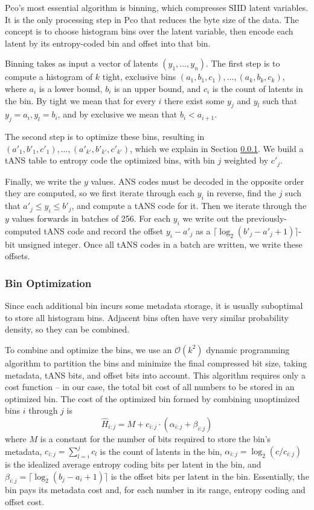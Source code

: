 \documentclass[letterpaper]{article}
\begin{document}
Pco's most essential algorithm is binning, which compresses SIID latent variables.
It is the only processing step in Pco that reduces the byte size of the data.
The concept is to choose histogram bins over the latent variable, then encode each latent by its entropy-coded bin and offset into that bin.

Binning takes as input a vector of latents $(y_1, \ldots, y_n)$.
The first step is to compute a histogram of $k$ tight, exclusive bins $(a_1, b_1, c_1), \ldots, (a_k, b_k, c_k)$, where $a_i$ is a lower bound, $b_i$ is an upper bound, and $c_i$ is the count of latents in the bin.
By tight we mean that for every $i$ there exist some $y_j$ and $y_l$ such that $y_j = a_i, y_l = b_i$, and by exclusive we mean that $b_i < a_{i+1}$.

The second step is to optimize these bins, resulting in $(a'_1, b'_1, c'_1), \ldots, (a'_{k'}, b'_{k'}, c'_{k'})$, which we explain in Section \ref{sec:bin_optimization}.
We build a tANS table \cite{ans} to entropy code the optimized bins, with bin $j$ weighted by $c'_j$.

Finally, we write the $y$ values.
ANS codes must be decoded in the opposite order they are computed, so we first iterate through each $y_i$ in reverse, find the $j$ such that $a'_j \le y_i \le b'_j$, and compute a tANS code for it.
Then we iterate through the $y$ values forwards in batches of 256.
For each $y_i$ we write out the previously-computed tANS code and record the offset $y_i - a'_j$ as a $\lceil\log_2(b'_j - a'_j + 1)\rceil$-bit unsigned integer.
Once all tANS codes in a batch are written, we write these offsets.

\subsubsection{Bin Optimization}
\label{sec:bin_optimization}

Since each additional bin incurs some metadata storage, it is usually suboptimal to store all histogram bins.
Adjacent bins often have very similar probability density, so they can be combined.

To combine and optimize the bins, we use an $\mathcal{O}(k^2)$ dynamic programming algorithm \cite{optimal_partitioning} to partition the bins and minimize the final compressed bit size, taking metadata, tANS bits, and offset bits into account.
This algorithm requires only a cost function -- in our case, the total bit cost of all numbers to be stored in an optimized bin.
The cost of the optimized bin formed by combining unoptimized bins $i$ through $j$ is
\[\hat{H}_{i:j} = M + c_{i:j} \cdot (\alpha_{i:j} + \beta_{i:j})\]
where $M$ is a constant for the number of bits required to store the bin's metadata,
$c_{i:j} = \sum_{l=i}^j c_l$ is the count of latents in the bin,
$\alpha_{i:j} = \log_2\left(c / c_{i:j}\right)$ is the idealized average entropy coding bits per latent in the bin, and
$\beta_{i:j} = \lceil\log_2(b_j - a_i + 1)\rceil$ is the offset bits per latent in the bin.
Essentially, the bin pays its metadata cost and, for each number in its range, entropy coding and offset cost.
\end{document}
